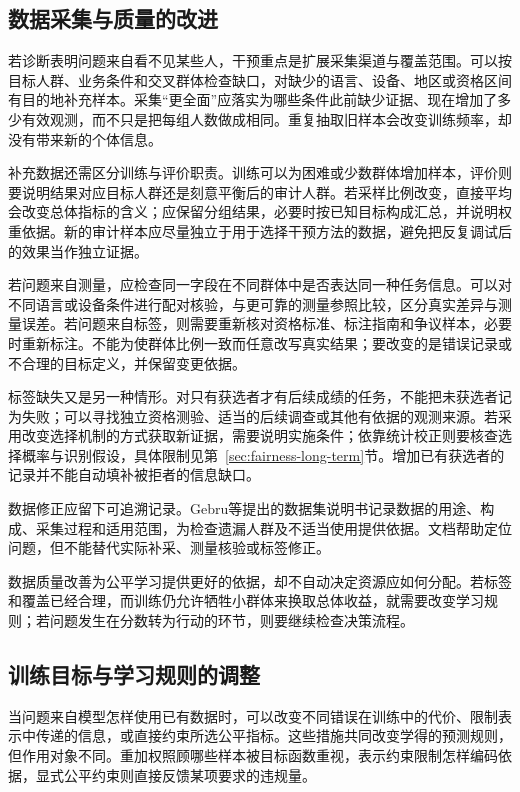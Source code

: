 \subsection{数据采集与质量的改进}
\label{sec:fairness-data-intervention}

若诊断表明问题来自看不见某些人，干预重点是扩展采集渠道与覆盖范围。可以按目标人群、业务条件和交叉群体检查缺口，对缺少的语言、设备、地区或资格区间有目的地补充样本。采集“更全面”应落实为哪些条件此前缺少证据、现在增加了多少有效观测，而不只是把每组人数做成相同。重复抽取旧样本会改变训练频率，却没有带来新的个体信息。

补充数据还需区分训练与评价职责。训练可以为困难或少数群体增加样本，评价则要说明结果对应目标人群还是刻意平衡后的审计人群。若采样比例改变，直接平均会改变总体指标的含义；应保留分组结果，必要时按已知目标构成汇总，并说明权重依据。新的审计样本应尽量独立于用于选择干预方法的数据，避免把反复调试后的效果当作独立证据。

若问题来自测量，应检查同一字段在不同群体中是否表达同一种任务信息。可以对不同语言或设备条件进行配对核验，与更可靠的测量参照比较，区分真实差异与测量误差。若问题来自标签，则需要重新核对资格标准、标注指南和争议样本，必要时重新标注。不能为使群体比例一致而任意改写真实结果；要改变的是错误记录或不合理的目标定义，并保留变更依据。

标签缺失又是另一种情形。对只有获选者才有后续成绩的任务，不能把未获选者记为失败；可以寻找独立资格测验、适当的后续调查或其他有依据的观测来源。若采用改变选择机制的方式获取新证据，需要说明实施条件；依靠统计校正则要核查选择概率与识别假设，具体限制见第~\ref{sec:fairness-long-term}节。增加已有获选者的记录并不能自动填补被拒者的信息缺口。

数据修正应留下可追溯记录。Gebru等提出的数据集说明书记录数据的用途、构成、采集过程和适用范围，为检查遗漏人群及不适当使用提供依据。文档帮助定位问题，但不能替代实际补采、测量核验或标签修正。

数据质量改善为公平学习提供更好的依据，却不自动决定资源应如何分配。若标签和覆盖已经合理，而训练仍允许牺牲小群体来换取总体收益，就需要改变学习规则；若问题发生在分数转为行动的环节，则要继续检查决策流程。

\subsection{训练目标与学习规则的调整}
\label{sec:fairness-learning-intervention}

当问题来自模型怎样使用已有数据时，可以改变不同错误在训练中的代价、限制表示中传递的信息，或直接约束所选公平指标。这些措施共同改变学得的预测规则，但作用对象不同。重加权照顾哪些样本被目标函数重视，表示约束限制怎样编码依据，显式公平约束则直接反馈某项要求的违规量。

